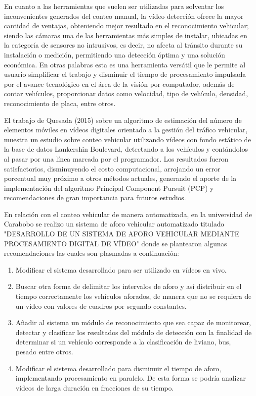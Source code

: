 En cuanto a las herramientas que suelen ser utilizadas para solventar los inconvenientes
generados del conteo manual, la vídeo detección ofrece la mayor cantidad de ventajas, obteniendo mejor resultado en el reconocimiento vehicular; siendo las cámaras una de las herramientas más simples de instalar, ubicadas en la categoría de sensores no intrusivos, es decir, no afecta al tránsito durante su instalación o medición, permitiendo una detección óptima y una solución económica. En otras palabras esta es una herramienta versátil que le permite al usuario simplificar el trabajo y disminuir el tiempo de procesamiento impulsada por el avance tecnológico en el área de la visión por computador, además de contar vehículos, proporcionar datos como velocidad, tipo de vehículo, densidad, reconocimiento de placa, entre otros.

El trabajo de Quesada (2015) sobre un algoritmo de estimación del número de elementos móviles en vídeos digitales orientado a la gestión del tráfico vehicular, muestra un estudio sobre conteo vehicular utilizando vídeos con fondo estático de la base de datos Lankershin Boulevard, detectando a los vehículos y contándolos al pasar por una línea marcada por el programador. Los resultados fueron satisfactorios, disminuyendo el costo computacional, arrojando un error porcentual muy próximo a otros métodos actuales, generando el aporte de la implementación del algoritmo Principal Component Pursuit (PCP) y recomendaciones de gran importancia para futuros estudios.

En relación con el conteo vehicular de manera automatizada, en la universidad de Carabobo se realizo un sistema de aforo vehicular automatizado titulado "DESARROLLO DE UN SISTEMA DE AFORO VEHICULAR MEDIANTE PROCESAMIENTO DIGITAL DE VÍDEO" donde se plantearon algunas recomendaciones las cuales son plasmadas a continuación:

\begin{enumerate}
	\item Modificar el sistema desarrollado para ser utilizado en vídeos en vivo.
	\item Buscar otra forma de delimitar los intervalos de aforo y así distribuir en el tiempo correctamente los vehículos aforados, de manera que no se requiera de un vídeo con valores de cuadros por segundo constantes.
	\item Añadir al sistema un módulo de reconocimiento que sea capaz de monitorear, detectar y clasificar los resultados del módulo de detección con la finalidad de determinar si un vehículo corresponde a la clasificación de liviano, bus, pesado entre otros.
	\item Modificar el sistema desarrollado para disminuir el tiempo de aforo, implementando procesamiento en paralelo. De esta forma se podría analizar vídeos de larga duración en fracciones de su tiempo.
	
\end{enumerate}

